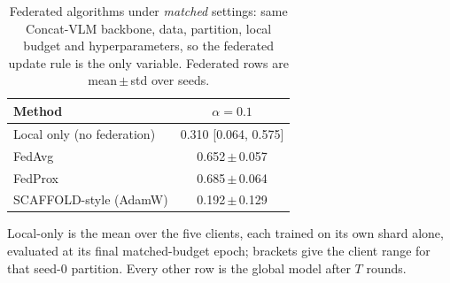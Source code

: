 \begin{table}[t]
\caption{Federated algorithms under \emph{matched} settings: same
Concat-VLM backbone, data, partition, local budget and hyperparameters, so
the federated update rule is the only variable. Federated rows are
mean\,$\pm$\,std over seeds.}
\label{tab:baselines}
\centering\footnotesize
\setlength\tabcolsep{5pt}
\begin{tabular}{lc}
\toprule
\textbf{Method} & $\alpha=0.1$\\
\midrule
Local only (no federation) & 0.310 [0.064, 0.575] \\
FedAvg & 0.652\,$\pm$\,0.057 \\
FedProx & 0.685\,$\pm$\,0.064 \\
SCAFFOLD-style (AdamW) & 0.192\,$\pm$\,0.129 \\
\bottomrule
\end{tabular}
\vspace{1pt}

{\scriptsize Local-only is the mean over the five clients, each trained on its
own shard alone, evaluated at its final matched-budget epoch; brackets give
the client range for that seed-0 partition. Every other
row is the global model after $T$ rounds.}
\end{table}
